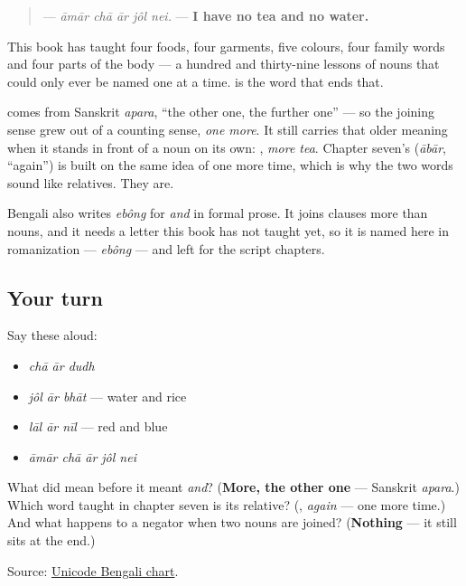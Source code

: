 \begin{quote}
\textbf{    } — \emph{āmār chā ār jôl nei.} — \textbf{I have no tea and no water.}
\end{quote}

This book has taught four foods, four garments, five colours, four family words and four parts of the body — a hundred and thirty-nine lessons of nouns that could only ever be named one at a time. \textbf{} is the word that ends that.

\begin{cousinweb}
\textbf{} comes from Sanskrit \emph{apara}, \textquotedblleft{}the other one, the further one\textquotedblright{} — so the joining sense grew out of a counting sense, \emph{one more}. It still carries that older meaning when it stands in front of a noun on its own: \textbf{ }, \emph{more tea}. Chapter seven's \textbf{} (\emph{ābār}, \textquotedblleft{}again\textquotedblright{}) is built on the same idea of one more time, which is why the two words sound like relatives. They are.

Bengali also writes \emph{ebông} for \emph{and} in formal prose. It joins clauses more than nouns, and it needs a letter this book has not taught yet, so it is named here in romanization — \emph{ebông} — and left for the script chapters.
\end{cousinweb}

\subsection*{Your turn}
Say these aloud:

\begin{itemize}
\raggedright
  \item \emph{chā ār dudh}
  \item \emph{jôl ār bhāt} — water and rice
  \item \emph{lāl ār nīl} — red and blue
  \item \emph{āmār chā ār jôl nei}
\end{itemize}

\begin{tcolorbox}[breakable,colback=teal!4,colframe=teal!35!black,title={Before you move on}]
What did \textbf{} mean before it meant \emph{and}? (\textbf{More, the other one} — Sanskrit \emph{apara}.) Which word taught in chapter seven is its relative? (\textbf{}, \emph{again} — one more time.) And what happens to a negator when two nouns are joined? (\textbf{Nothing} — it still sits at the end.)

Source: \href{https://www.unicode.org/charts/PDF/U0980.pdf}{Unicode Bengali chart}.
\end{tcolorbox}
